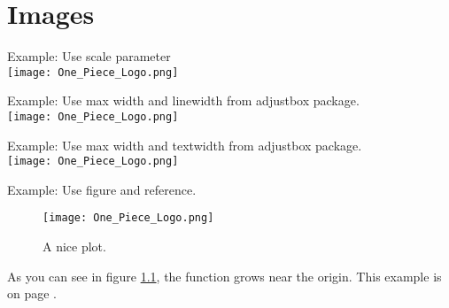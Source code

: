 \documentclass[letterpaper, oneside]{book}
\begin{document}
	
	
	
	\chapter{Images}
	Example: Use scale parameter \\
	\texttt{[image: One\_Piece\_Logo.png]}  

	Example: Use max width and linewidth from adjustbox package. \\
	\texttt{[image: One\_Piece\_Logo.png]}  
	
	Example: Use max width and textwidth from adjustbox package. \\
	\texttt{[image: One\_Piece\_Logo.png]}  
	
	Example: Use figure and reference.
	\begin{figure}[h]
		\centering
		\texttt{[image: One\_Piece\_Logo.png]}
		\caption{A nice plot.}
		\label{fig:mesh1}
	\end{figure}
	
	As you can see in figure \ref{fig:mesh1}, the function grows near the origin. This example is on page \pageref{fig:mesh1}.
	
	


		
	
	
	
	
	
\end{document}
